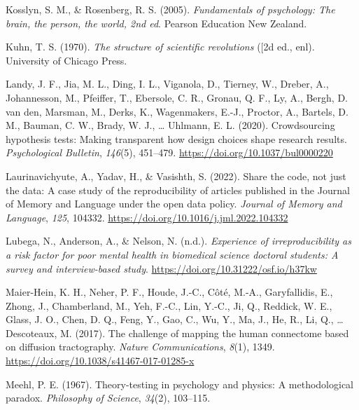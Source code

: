 \documentclass[
  letterpaper,
  DIV=11,
  numbers=noendperiod]{scrreprt}
\newlength{\cslhangindent}
\newlength{\cslentryspacingunit} %
\newenvironment{CSLReferences}[2] %
 {%
  \setlength{\parindent}{0pt}
  \ifodd #1
  \let\oldpar\par
  \def\par{\hangindent=\cslhangindent\oldpar}
  \fi
  \setlength{\parskip}{#2\cslentryspacingunit}
 }%
 {}
\begin{document}
\begin{CSLReferences}{1}{0}
\leavevmode{}%
Kosslyn, S. M., \& Rosenberg, R. S. (2005). \emph{Fundamentals of
psychology: The brain, the person, the world, 2nd ed}. Pearson Education
New Zealand.

\leavevmode{}%
Kuhn, T. S. (1970). \emph{The structure of scientific revolutions}
({[}2d ed., enl). University of Chicago Press.

\leavevmode{}%
Landy, J. F., Jia, M. L., Ding, I. L., Viganola, D., Tierney, W.,
Dreber, A., Johannesson, M., Pfeiffer, T., Ebersole, C. R., Gronau, Q.
F., Ly, A., Bergh, D. van den, Marsman, M., Derks, K., Wagenmakers,
E.-J., Proctor, A., Bartels, D. M., Bauman, C. W., Brady, W. J.,
\ldots{} Uhlmann, E. L. (2020). Crowdsourcing hypothesis tests: Making
transparent how design choices shape research results.
\emph{Psychological Bulletin}, \emph{146}(5), 451--479.
\url{https://doi.org/10.1037/bul0000220}

\leavevmode{}%
Laurinavichyute, A., Yadav, H., \& Vasishth, S. (2022). Share the code,
not just the data: A case study of the reproducibility of articles
published in the Journal of Memory and Language under the open data
policy. \emph{Journal of Memory and Language}, \emph{125}, 104332.
\url{https://doi.org/10.1016/j.jml.2022.104332}

\leavevmode{}%
Lubega, N., Anderson, A., \& Nelson, N. (n.d.). \emph{Experience of
irreproducibility as a risk factor for poor mental health in biomedical
science doctoral students: A survey and interview-based study}.
\url{https://doi.org/10.31222/osf.io/h37kw}

\leavevmode{}%
Maier-Hein, K. H., Neher, P. F., Houde, J.-C., Côté, M.-A.,
Garyfallidis, E., Zhong, J., Chamberland, M., Yeh, F.-C., Lin, Y.-C.,
Ji, Q., Reddick, W. E., Glass, J. O., Chen, D. Q., Feng, Y., Gao, C.,
Wu, Y., Ma, J., He, R., Li, Q., \ldots{} Descoteaux, M. (2017). The
challenge of mapping the human connectome based on diffusion
tractography. \emph{Nature Communications}, \emph{8}(1), 1349.
\url{https://doi.org/10.1038/s41467-017-01285-x}

\leavevmode{}%
Meehl, P. E. (1967). Theory-testing in psychology and physics: A
methodological paradox. \emph{Philosophy of Science}, \emph{34}(2),
103--115.


\end{CSLReferences}
\end{document}
